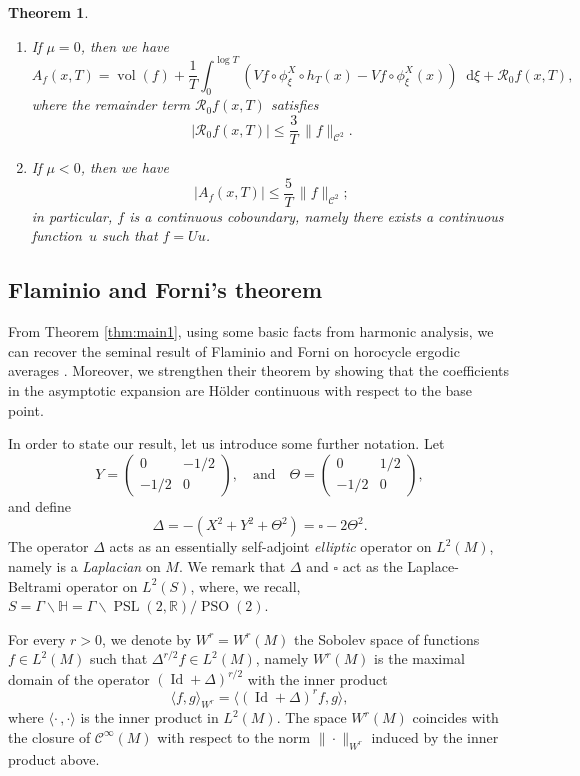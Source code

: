 \documentclass[10pt]{amsart}
\newenvironment{enumeratei}
{\bgroup\def\theenumi{\roman{enumi}}\def\theenumii{\arabic{enumii}}\begin{enumerate}}
{\end{enumerate}\egroup}
\newcommand \R{\mathbb{R}}
\newcommand \Hbb{\mathbb{H}}
\newcommand*{\diff}{\mathop{}\!\mathrm{d}}
\newcommand{\aver}[1]{A_{#1}(x,T)}
\DeclareMathOperator{\PSL}{PSL}
\DeclareMathOperator{\PSO}{PSO}
\DeclareMathOperator{\vol}{vol}
\DeclareMathOperator{\Id}{Id}
\newtheorem{theorem}{Theorem}
\theoremstyle{definition}
\begin{document}
\begin{theorem}
\begin{enumeratei}
\item\label{thm:main1iv}
If $\mu = 0$, then we have
\[
\aver{f} = \vol(f) + \frac{1}{T} \int_0^{\log T} \left(Vf \circ \phi^X_\xi \circ h_T(x) - Vf\circ \phi^X_\xi (x) \right) \diff \xi + \mathcal{R}_{0}f(x,T),
\]
where the remainder term $\mathcal{R}_{0}f(x,T)$ satisfies
\[
|\mathcal{R}_{0}f(x,T)|\leq \frac{3}{T}\, \|f\|_{\mathscr{C}^2}.
\]

\item\label{thm:main1v}
If $\mu < 0$, then we have
\[
|\aver{f} |\leq \frac{5}{T}\, \|f\|_{\mathscr{C}^2};
\]
in particular, $f$ is a continuous coboundary, namely there exists a continuous function~$u$ such that $f=Uu$.
\end{enumeratei}
\end{theorem}

\subsection{Flaminio and Forni's theorem}

From Theorem \ref{thm:main1}, using some basic facts from harmonic analysis, we can recover the seminal result of Flaminio and Forni on horocycle ergodic averages \cite[Th.\,1.5]{FlaFo}.
Moreover, we strengthen their theorem by showing that the coefficients in the asymptotic expansion are Hölder continuous with respect to the base point.

In order to state our result, let us introduce some further notation.
Let
\[
Y =
\begin{pmatrix}
0 & -1/2 \\
-1/2 & 0
\end{pmatrix},
\ \ \ \text{ and }\ \ \
\Theta =
\begin{pmatrix}
0 & 1/2 \\
-1/2 & 0
\end{pmatrix},
\]
and define
\[
\Delta = -(X^2 + Y^2 + \Theta^2) = \square - 2 \Theta^2.
\]
The operator $\Delta$ acts as an essentially self-adjoint \emph{elliptic} operator on $L^2(M)$, namely is a \emph{Laplacian} on $M$.
We remark that $\Delta$ and $\square$ act as the Laplace-Beltrami operator on $L^2(S)$, where, we recall, $S = \Gamma \backslash \Hbb = \Gamma \backslash \PSL(2,\R) / \PSO(2)$.

For every $r >0$, we denote by $W^r=W^r(M)$ the Sobolev space of functions $f \in L^2(M)$ such that $\Delta^{r/2}f \in L^2(M)$, namely $W^r(M)$ is the maximal domain of the operator $(\Id + \Delta)^{r/2}$ with the inner product
\begin{equation}\label{eq:def_inn_prod_Wr}
\langle f,g \rangle_{W^r} = \langle (\Id + \Delta)^rf,g \rangle,
\end{equation}
where $\langle \cdot\,, \cdot \rangle$ is the inner product in $L^2(M)$.
The space $W^r(M)$ coincides with the closure of $\mathscr{C}^\infty(M)$ with respect to the norm $\|{\cdot} \|_{W^r}$ induced by the inner product above.
\end{document}

